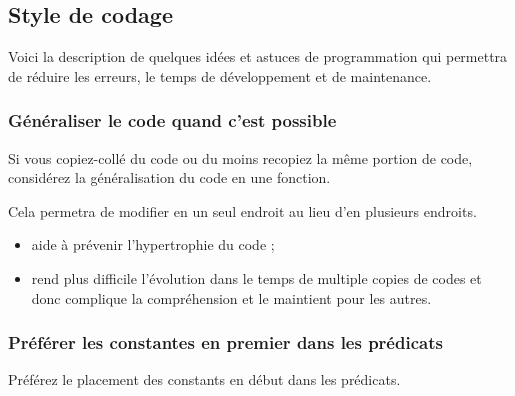 \subsection{Style de codage}
Voici la description de quelques idées et astuces de programmation qui permettra de réduire les erreurs, le temps de développement et de maintenance.

\subsubsection{Généraliser le code quand c'est possible}

Si vous copiez-collé du code ou du moins recopiez la même portion de code, considérez la généralisation du code en une fonction.

Cela permetra de modifier en un seul endroit au lieu d'en plusieurs endroits.

\begin{itemize}
\item aide à prévenir l'hypertrophie du code ;
\item rend plus difficile l'évolution dans le temps de multiple copies de codes et donc complique la compréhension et le maintient pour les autres.
\end{itemize}

\subsubsection{Préférer les constantes en premier dans les prédicats}
Préférez le placement des constants en début dans les prédicats.

